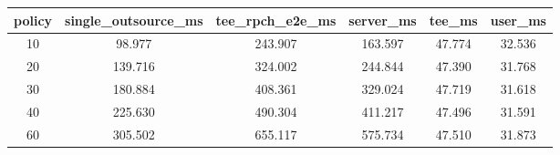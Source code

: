\begin{tabular}{c c c c c c}
\toprule
policy & single\_outsource\_ms & tee\_rpch\_e2e\_ms & server\_ms & tee\_ms & user\_ms \\
\midrule
10 & 98.977 & 243.907 & 163.597 & 47.774 & 32.536 \\
20 & 139.716 & 324.002 & 244.844 & 47.390 & 31.768 \\
30 & 180.884 & 408.361 & 329.024 & 47.719 & 31.618 \\
40 & 225.630 & 490.304 & 411.217 & 47.496 & 31.591 \\
60 & 305.502 & 655.117 & 575.734 & 47.510 & 31.873 \\
\bottomrule
\end{tabular}
